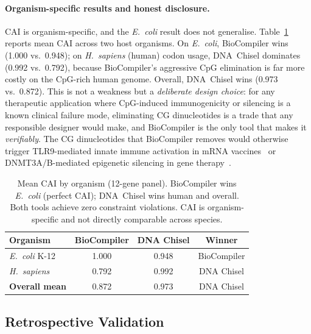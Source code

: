 \documentclass[acmsmall,review,anonymous]{acmart}
\begin{document}
\paragraph{Organism-specific results and honest disclosure.}
CAI is organism-specific, and the \textit{E.~coli} result does not
generalise.  Table~\ref{tab:organism-summary} reports mean CAI across two
host organisms.  On \textit{E.~coli}, BioCompiler wins (1.000 vs.\ 0.948);
on \emph{H.~sapiens} (human) codon usage, DNA~Chisel dominates (0.992
vs.\ 0.792), because BioCompiler's aggressive CpG elimination is far
more costly on the CpG-rich human genome.  Overall, DNA~Chisel wins
(0.973 vs.\ 0.872).  This is not a weakness but a \emph{deliberate
design choice}: for any therapeutic application where CpG-induced
immunogenicity or silencing is a known clinical failure mode,
eliminating CG dinucleotides is a trade that any responsible designer
would make, and BioCompiler is the only tool that makes it
\emph{verifiably}.  The CG dinucleotides that BioCompiler removes would
otherwise trigger TLR9-mediated innate immune activation in mRNA
vaccines~\cite{bauer2010cpg} or DNMT3A/B-mediated epigenetic silencing
in gene therapy~\cite{krinner2015cpg}.

\begin{table}[t]
\centering
\caption{Mean CAI by organism (12-gene panel).  BioCompiler wins
         \textit{E.~coli} (perfect CAI); DNA~Chisel wins human and
         overall.  Both tools achieve zero constraint violations.
         CAI is organism-specific and not directly comparable across
         species.}
\label{tab:organism-summary}
\begin{tabular}{lccc}
\toprule
\textbf{Organism} & \textbf{BioCompiler} & \textbf{DNA Chisel} & \textbf{Winner} \\
\midrule
\textit{E.~coli} K-12    & 1.000 & 0.948 & BioCompiler \\
\emph{H.~sapiens}       & 0.792 & 0.992 & DNA Chisel \\
\midrule
\textbf{Overall mean}    & 0.872 & 0.973 & DNA Chisel \\
\bottomrule
\end{tabular}
\end{table}

\subsection{Retrospective Validation}\label{sec:retro}
\end{document}

